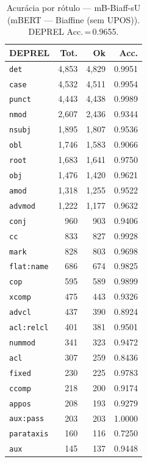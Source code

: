 \begin{table}[ht]
\centering
\caption{Acurácia por rótulo --- mB-Biaff-sU (mBERT — Biaffine (sem UPOS)). DEPREL Acc.\,=\,0.9655.}
\label{tab:acc-predict-test-ablacao-biaffine-google-bert-bert-base-multilingual-cased-fold0}
\scriptsize
\begin{tabular}{lrrr}
\toprule
\textbf{DEPREL} & \textbf{Tot.} & \textbf{Ok} & \textbf{Acc.} \\
\midrule
\texttt{det} & 4,853 & 4,829 & 0.9951 \\
\texttt{case} & 4,532 & 4,511 & 0.9954 \\
\texttt{punct} & 4,443 & 4,438 & 0.9989 \\
\texttt{nmod} & 2,607 & 2,436 & 0.9344 \\
\texttt{nsubj} & 1,895 & 1,807 & 0.9536 \\
\texttt{obl} & 1,746 & 1,583 & 0.9066 \\
\texttt{root} & 1,683 & 1,641 & 0.9750 \\
\texttt{obj} & 1,476 & 1,420 & 0.9621 \\
\texttt{amod} & 1,318 & 1,255 & 0.9522 \\
\texttt{advmod} & 1,222 & 1,177 & 0.9632 \\
\texttt{conj} & 960 & 903 & 0.9406 \\
\texttt{cc} & 833 & 827 & 0.9928 \\
\texttt{mark} & 828 & 803 & 0.9698 \\
\texttt{flat\!:\!name} & 686 & 674 & 0.9825 \\
\texttt{cop} & 595 & 589 & 0.9899 \\
\texttt{xcomp} & 475 & 443 & 0.9326 \\
\texttt{advcl} & 437 & 390 & 0.8924 \\
\texttt{acl\!:\!relcl} & 401 & 381 & 0.9501 \\
\texttt{nummod} & 341 & 323 & 0.9472 \\
\texttt{acl} & 307 & 259 & 0.8436 \\
\texttt{fixed} & 230 & 225 & 0.9783 \\
\texttt{ccomp} & 218 & 200 & 0.9174 \\
\texttt{appos} & 208 & 193 & 0.9279 \\
\texttt{aux\!:\!pass} & 203 & 203 & 1.0000 \\
\texttt{parataxis} & 160 & 116 & 0.7250 \\
\texttt{aux} & 145 & 137 & 0.9448 \\

\end{tabular}
\end{table}
